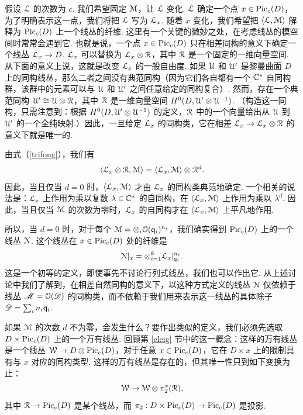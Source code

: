 假设 ${\cal L}$ 的次数为 $c$. 我们希望固定 ${\cal M}$，让 ${\cal L}$ 变化. ${\cal L}$ 确定一个点 $x\in {\rm Pic}_c(D)$，为了明确表示这一点，我们将把 ${\cal L}$ 写为 ${\cal L}_x$. 随着 $x$ 变化，我们希望把 $\langle{\cal L},{\cal M}\rangle$ 解释为 ${\rm Pic}_c(D)$ 上一个线丛的纤维. 这里有一个关键的微妙之处，在考虑线丛的模空间时常常会遇到它. 也就是说，一个点 $x\in {\rm Pic}_c(D)$ 只在相差同构的意义下确定一个线丛 ${\cal L}_x\to D$. ${\cal L}_x$ 可以替换为 ${\cal L}_x\otimes {\cal R}$，其中 ${\cal R}$ 是一个固定的一维向量空间. 从下面的意义上说，这就是改变 ${\cal L}_x$ 的一般自由度. 如果 ${\cal U}$ 和 ${\cal U}'$ 是黎曼曲面 $D$ 上的同构线丛，那么二者之间没有典范同构（因为它们各自都有一个 $\Bbb{C}^*$ 自同构群，该群中的元素可以与 ${\cal U}$ 和 ${\cal U}'$ 之间任意给定的同构复合）. 然而，存在一个典范同构 ${\cal U}'\cong {\cal U}\otimes {\cal R}$，其中 ${\cal R}$ 是一维向量空间 $H^0(D,{\cal U}'\otimes {\cal
U}^{-1})$. （构造这一同构，只需注意到：根据 $H^0(D,{\cal U}'\otimes {\cal U}^{-1})$ 的定义，${\cal R}$ 中的一个向量给出从 ${\cal U}$ 到 ${\cal U}'$ 的一个全纯映射.）因此，一旦给定 ${\cal L}_x$ 的同构类，它在相差 ${\cal L}_x\to {\cal L}_x \otimes {\cal R}$ 的意义下就是唯一的.

由式（\ref{trifong}），我们有
\begin{equation}\label{iftong}
\langle{\cal L}_x\otimes{\cal R},{\cal M}\rangle =\langle{\cal L}_x,{\cal M}\rangle
\otimes{\cal R}^d.
\end{equation}
因此，当且仅当 $d=0$ 时，$\langle{\cal L}_x,{\cal M}\rangle$ 才由 ${\cal L}_x$ 的同构类典范地确定. 一个相关的说法是：${\cal L}_x$ 上作用为乘以复数 $\lambda\in\Bbb{C}^*$ 的自同构，在 $\langle{\cal L}_x,{\cal M}\rangle$ 上作用为乘以 $\lambda^d$. 因此，当且仅当 ${\cal M}$ 的次数为零时，${\cal L}_x$ 的自同构才在 $\langle{\cal L}_x,{\cal M}\rangle$ 上平凡地作用.

所以，当 $d=0$ 时，对于每个 ${\cal M}=\otimes_i \O(\qq_i)^{n_i}$，我们确实得到 ${\rm Pic}_c(D)$ 上的一个线丛 ${\cal N}$. 这个线丛在 $x\in {\rm Pic}_c(D)$ 处的纤维是
\begin{equation}\label{zudco}
{\cal N}|_x=\otimes_{i=1}^k {\cal L}_x|_{\qq_i}^{n_i}.\end{equation}
这是一个初等的定义，即使事先不讨论行列式线丛，我们也可以作出它. 从上述讨论中我们了解到，在相差自然同构的意义下，以这种方式定义的线丛 $\cal N$ 仅依赖于线丛 $\M=\O(\DD)$ 的同构类，而不依赖于我们用来表示这一线丛的具体除子 $\DD=\sum_i n_i\qq_i$.

如果 ${\cal M}$ 的次数 $d$ 不为零，会发生什么？要作出类似的定义，我们必须先选取 $D\times \Pic_c(D)$ 上的一个万有线丛. 回顾第 \ref{eleig} 节中的这一概念：这样的万有线丛是一个线丛 $\W\to D\otimes \Pic_c(D)$，对于任意 $x\in \Pic_c(D)$，它在 $D\times x$ 上的限制具有与 $x$ 对应的同构类型. 这样的万有线丛是存在的，但其唯一性只到如下变换为止：
\begin{equation}\label{doffo}\W\to \W\otimes \pi_2^*(\RR),\end{equation}
其中 $\RR\to \Pic_c(D)$ 是某个线丛，而 $\pi_2:D\times\Pic_c(D)\to \Pic_c(D)$ 是投影.

